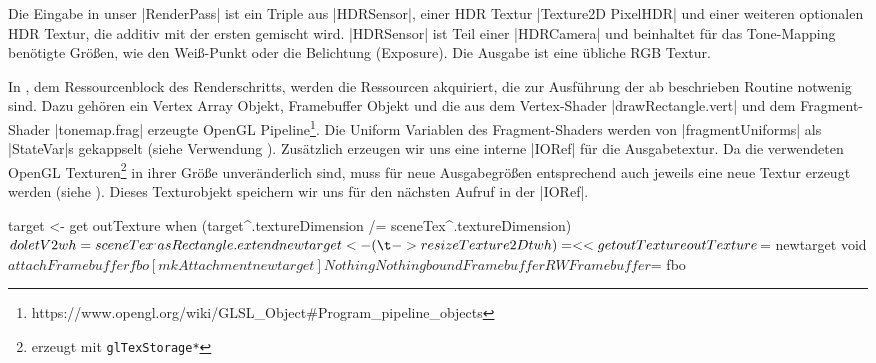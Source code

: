 Die Eingabe in unser |RenderPass| ist ein Triple aus |HDRSensor|, einer HDR Textur |Texture2D PixelHDR| und einer weiteren optionalen HDR Textur, die additiv mit der ersten gemischt wird. |HDRSensor| ist Teil einer |HDRCamera| und beinhaltet für das Tone-Mapping benötigte Größen, wie den Weiß-Punkt oder die Belichtung (Exposure). Die Ausgabe ist eine übliche RGB Textur.


In , dem Ressourcenblock des Renderschritts, werden die Ressourcen akquiriert, die zur Ausführung der ab  beschrieben Routine notwenig sind. Dazu gehören ein Vertex Array Objekt, Framebuffer Objekt und die aus dem Vertex-Shader |drawRectangle.vert| und dem Fragment-Shader |tonemap.frag| erzeugte OpenGL Pipeline\footnote{https://www.opengl.org/wiki/GLSL\_Object\#Program\_pipeline\_objects}. Die Uniform Variablen des Fragment-Shaders werden von |fragmentUniforms| als |StateVar|s gekappselt (siehe Verwendung ). Zusätzlich erzeugen wir uns eine interne |IORef| für die Ausgabetextur. Da die verwendeten OpenGL Texturen\footnote{erzeugt mit \texttt{glTexStorage*}} in ihrer Größe unveränderlich sind, muss für neue Ausgabegrößen entsprechend auch jeweils eine neue Textur erzeugt werden (siehe ). Dieses Texturobjekt speichern wir uns für den nächsten Aufruf in der |IORef|.

\begin{haskell}[label={lst:tonemap-pass-run-reize},caption={[ToneMapPass Größenanpassung des Framebuffers]\texttt{ToneMapPass} Größenanpassung des Framebuffers},nolol,float,floatplacement=H]
    target <- get outTexture
    when (target^.textureDimension /= sceneTex^.textureDimension) $ do
      let V2 w h = sceneTex^.asRectangle.extend
      newtarget <- (\t -> resizeTexture2D t w h) =<< get outTexture
      outTexture $= newtarget
      void $ attachFramebuffer fbo [mkAttachment newtarget] Nothing Nothing
    boundFramebuffer RWFramebuffer $= fbo
\end{haskell}

